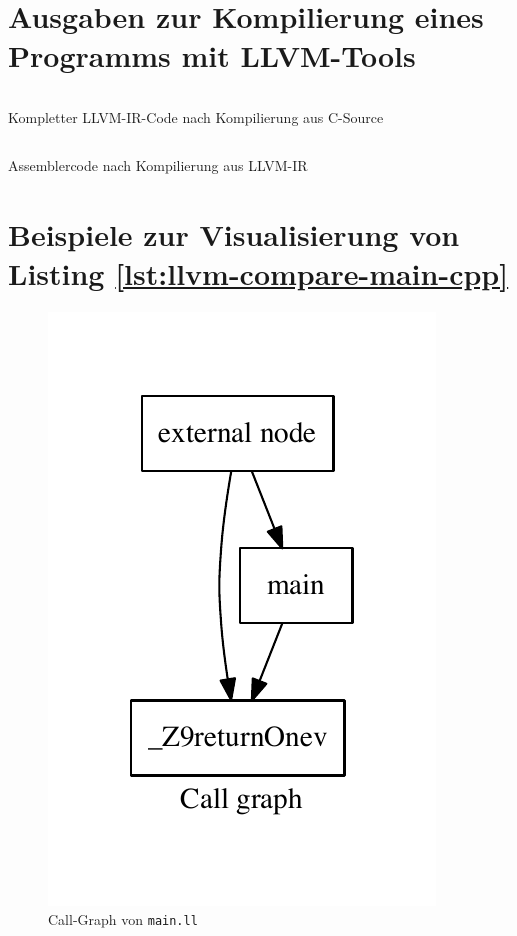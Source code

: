 \appendix
\renewcommand{\thesection}{\Alph{section}}
\renewcommand\thefigure{\thesection.\arabic{figure}}
\renewcommand\thelisting{\thesection.\arabic{listing}} 

\section{Ausgaben zur Kompilierung eines Programms mit LLVM-Tools}

\begin{code}
\inputminted[linenos]{llvm}{../Resources/Code/c-to-llvm/main.ll}
\caption{Kompletter LLVM-IR-Code nach Kompilierung aus C-Source}
\label{lst:llvm-von-c}
\end{code}

\newpage

\begin{code}
\inputminted[linenos]{nasm}{../Resources/Code/c-to-llvm/main.s}
\caption{Assemblercode nach Kompilierung aus LLVM-IR}
\label{lst:assembler-von-llvm}
\end{code}

\newpage

\section{Beispiele zur Visualisierung von Listing \ref{lst:llvm-compare-main-cpp}}
\label{sec:beispiele-zur-visualisierung}

\begin{figure}[H]
\centering
\includegraphics[scale=.8]{../Resources/Bilder/main_callgraph.pdf}
\caption{Call-Graph von \texttt{main.ll}}
\label{fig:main-callgraph}
\end{figure}

